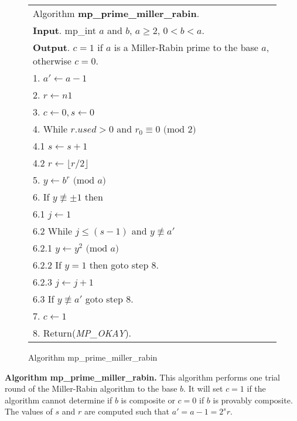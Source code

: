\documentclass[b5paper]{book}
\def\nequiv{\not\equiv}
\begin{document}
\begin{figure}[!here]
\begin{small}
\begin{center}
\begin{tabular}{l}
\hline Algorithm \textbf{mp\_prime\_miller\_rabin}. \\
\textbf{Input}.   mp\_int $a$ and $b$, $a \ge 2$, $0 < b < a$.  \\
\textbf{Output}.  $c = 1$ if $a$ is a Miller-Rabin prime to the base $a$, otherwise $c = 0$.  \\
\hline
1.  $a' \leftarrow a - 1$ \\
2.  $r  \leftarrow n1$    \\
3.  $c \leftarrow 0, s  \leftarrow 0$ \\
4.  While $r.used > 0$ and $r_0 \equiv 0 \mbox{ (mod }2\mbox{)}$ \\
\hspace{3mm}4.1  $s \leftarrow s + 1$ \\
\hspace{3mm}4.2  $r \leftarrow \lfloor r / 2 \rfloor$ \\
5.  $y \leftarrow b^r \mbox{ (mod }a\mbox{)}$ \\
6.  If $y \nequiv \pm 1$ then \\
\hspace{3mm}6.1  $j \leftarrow 1$ \\
\hspace{3mm}6.2  While $j \le (s - 1)$ and $y \nequiv a'$ \\
\hspace{6mm}6.2.1  $y \leftarrow y^2 \mbox{ (mod }a\mbox{)}$ \\
\hspace{6mm}6.2.2  If $y = 1$ then goto step 8. \\
\hspace{6mm}6.2.3  $j \leftarrow j + 1$ \\
\hspace{3mm}6.3  If $y \nequiv a'$ goto step 8. \\
7.  $c \leftarrow 1$\\
8.  Return(\textit{MP\_OKAY}). \\
\hline
\end{tabular}
\end{center}
\end{small}
\caption{Algorithm mp\_prime\_miller\_rabin}
\end{figure}
\textbf{Algorithm mp\_prime\_miller\_rabin.}
This algorithm performs one trial round of the Miller-Rabin algorithm to the base $b$.  It will set $c = 1$ if the algorithm cannot determine
if $b$ is composite or $c = 0$ if $b$ is provably composite.  The values of $s$ and $r$ are computed such that $a' = a - 1 = 2^sr$.  
\end{document}
